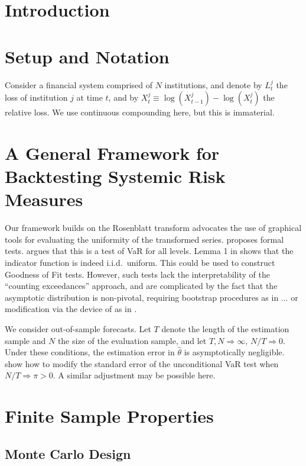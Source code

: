 \documentclass[12pt]{article}
\begin{document}
\newpage
{} %





\section{Introduction}
\section{Setup and Notation}
Consider a financial system comprised of $N$ institutions, and denote by $L^j_t$ the loss of institution $j$ at time $t$, and by $X^j_t\equiv \log(X^j_{t-1})-\log(X^j_t)$ the relative loss. We use continuous compounding here, but this is immaterial.
\section{A General Framework for Backtesting Systemic Risk Measures}
Our framework builds on the Rosenblatt transform \citep{rosenblatt:52}
\citet{diebold:98} advocates the use of graphical tools for evaluating the uniformity of the transformed series. \citet{berkowitz:01} proposes formal tests. \citet{campbell06} argues that this is a test of VaR for all levels.
Lemma 1 in \citet{bai:03} shows that the indicator function is indeed i.i.d.\ uniform. This could be used to construct Goodness of Fit tests. However, such tests lack the interpretability of the ``counting exceedances'' approach, and are complicated by the fact that the asymptotic distribution is non-pivotal, requiring bootstrap procedures as in ... or modification via the device of \citet{kh:81} as in \citet{bai:03}. 


We consider out-of-sample forecasts. %
Let $T$ denote the length of the estimation sample and $N$ the size of the evaluation sample, and let $T, N \Rightarrow \infty$, $N/T\Rightarrow 0$. Under these conditions, the estimation error in $\hat{\theta}$ is asymptotically negligible. \citet{eo:10} show how to modify the standard error of the unconditional VaR test when $N/T\Rightarrow\pi>0$. A similar adjustment may be possible here.
\section{Finite Sample Properties}
\subsection{Monte Carlo Design}
\end{document}
